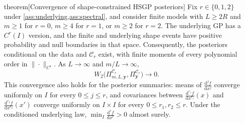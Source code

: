 \begin{theoremEnd}[combined main,category=approximation]{theorem}[Convergence of shape-constrained HSGP posteriors]
\label{thm:approximation}
Fix $r\in\{0,1,2\}$ under \cref{ass:underlying,ass:spectral}, and
consider finite models with $L\geq2R$ and $m\geq1$ for $r=0$,
$m\geq4$ for $r=1$, or $m\geq2$ for $r=2$.
The underlying GP has a $C^r(I)$ version, and the finite and underlying
shape events have positive probability and null boundaries in that space.
Consequently, the posteriors conditional on the data and $\mathcal C_r$
exist, with finite moments of every polynomial order in $\|\cdot\|_{C^r}$.
As $L\to\infty$ and $m/L\to\infty$,
\begin{equation}\label{eq:wasserstein}
 W_2\bigl(\Pi_{m,L,\boldsymbol y}^{\mathcal C_r},
          \Pi_{\boldsymbol y}^{\mathcal C_r}\bigr)\longrightarrow0.
\end{equation}
This convergence also holds for the posterior summaries: means of
$\frac{\mathrm{d}^jf}{\mathrm{d}x^j}$ converge uniformly on $I$ for
every $0\leq j\leq r$, and covariances between
$\frac{\mathrm{d}^{r_1}f}{\mathrm{d}x^{r_1}}(x)$ and $\frac{\mathrm{d}^{r_2}f}{\mathrm{d}x^{r_2}}(x')$
converge uniformly on $I\times I$ for every $0\leq r_1,r_2\leq r$.
Under the conditioned underlying law,
$\min_I\frac{\mathrm{d}^rf}{\mathrm{d}x^r}>0$ almost surely.
\end{theoremEnd}
